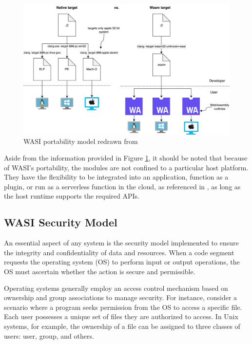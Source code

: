 \begin{figure}[H]
    \centering
        \includegraphics[width=1\linewidth]{images/wasm/WASI_PORTABILITY.pdf}
    \caption{WASI portability model redrawn from \cite{clark_2019_standardising}}
    \label{fig:wasi-portability}
\end{figure}

Aside from the information provided in Figure \ref{fig:wasi-portability}, it should be noted that because of WASI's portability, the modules are not confined to a particular host platform. They have the flexibility to be integrated into an application, function as a plugin, or run as a serverless function in the cloud, as referenced in \cite{clark_2022_wasmtime}, as long as the host runtime supports the required APIs.

\subsection{WASI Security Model}
\label{subsec:wasi-security-model}

An essential aspect of any system is the security model implemented to ensure the integrity and confidentiality of data and resources. When a code segment requests the operating system (OS) to perform input or output operations, the OS must ascertain whether the action is secure and permissible.

Operating systems generally employ an access control mechanism based on ownership and group associations to manage security. For instance, consider a scenario where a program seeks permission from the OS to access a specific file. Each user possesses a unique set of files they are authorized to access. In Unix systems, for example, the ownership of a file can be assigned to three classes of users: user, group, and others.

